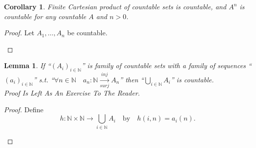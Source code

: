 \documentclass[10pt,a4paper]{book}
\newtheorem{lemma}{Lemma}[section]
\newtheorem{corollary}{Corollary}[section]
\begin{document}
\begin{corollary}
    Finite Cartesian product of countable sets is countable, and $A^n$ is countable for any countable $A$ and $n>0$.
\end{corollary}

\begin{proof}

    Let $A_1,\dots,A_n$ be countable.

    \begin{fitchproof}[arrayenv=tabular]


        \open
        \open
        \close
        \close

    \end{fitchproof}

\end{proof}

\begin{lemma} If ``$(A_i)_{i \in \mathbb{N}}$'' is family of countable sets with a family of sequences ``$(a_i)_{i \in \mathbb{N}}$''
    s.t. ``$ \forall n \in \mathbb{N} \quad a_n : \mathbb{N} \xrightarrow[surj]{inj} A_n $'' then ``$\bigcup_{i \in \mathbb{N}} A_i$'' is  countable.\\
    Proof Is Left As An Exercise To The Reader.
\end{lemma}

\begin{proof}

    Define
    \[
        h:\mathbb N\times\mathbb N \to \bigcup_{i\in\mathbb N}A_i
        \quad\text{by}\quad
        h(i,n)=a_i(n).
    \]

    \begin{fitchproof}[arrayenv=tabular]


        \open
        \close



    \end{fitchproof}

\end{proof}
\end{document}
